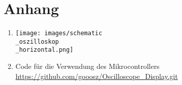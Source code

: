 \section*{Anhang}
\label{Anhang}

\begin{enumerate}[label=\textbf{A.\arabic*}]
	\item
		\label{Gesamte_Schematic}
		\begin{minipage}[]{\linewidth}
			\centering
			\texttt{[image: images/schematic\\\_oszilloskop\\\_horizontal.png]}
		\end{minipage}

	\item
		\label{Display_Code}
		Code für die Verwendung des Mikrocontrollers \newline
		\url{https://github.com/gooosz/Oscilloscope_Display.git}
\end{enumerate}
